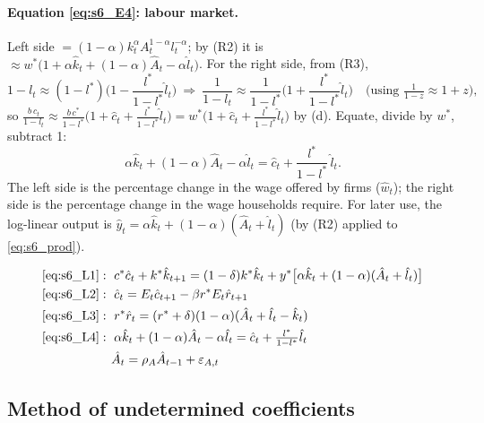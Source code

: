 \paragraph{Equation \eqref{eq:s6_E4}: labour market.} Left side $=(1-\alpha)k_t^{\alpha}A_t^{1-\alpha}l_t^{-\alpha}$; by (R2) it is $\approx w^*\big(1+\alpha\hat k_t+(1-\alpha)\hat A_t-\alpha\hat l_t\big)$. For the right side, from (R3),
\[
1-l_t\approx(1-l^*)\Big(1-\frac{l^*}{1-l^*}\hat l_t\Big)
\ \Rightarrow\ \frac{1}{1-l_t}\approx\frac{1}{1-l^*}\Big(1+\frac{l^*}{1-l^*}\hat l_t\Big)\quad\Big(\text{using }\tfrac{1}{1-z}\approx1+z\Big),
\]
so $\frac{b\,c_t}{1-l_t}\approx\frac{b\,c^*}{1-l^*}\big(1+\hat c_t+\frac{l^*}{1-l^*}\hat l_t\big)=w^*\big(1+\hat c_t+\frac{l^*}{1-l^*}\hat l_t\big)$ by (d). Equate, divide by $w^*$, subtract 1:
\begin{equation}\label{eq:s6_L4}
\alpha\hat k_t+(1-\alpha)\hat A_t-\alpha\hat l_t=\hat c_t+\frac{l^*}{1-l^*}\,\hat l_t .
\end{equation}
The left side is the percentage change in the wage offered by firms ($\hat w_t$); the right side is the percentage change in the wage households require. For later use, the log-linear output is $\hat y_t=\alpha\hat k_t+(1-\alpha)(\hat A_t+\hat l_t)$ (by (R2) applied to \eqref{eq:s6_prod}).

\begin{keybox}[title=Log-linear RBC system]
\begin{align*}
\eqref{eq:s6_L1}&:\ c^*\hat c_t+k^*\hat k_{t+1}=(1-\delta)k^*\hat k_t+y^*\big[\alpha\hat k_t+(1-\alpha)(\hat A_t+\hat l_t)\big]\\
\eqref{eq:s6_L2}&:\ \hat c_t=E_t\hat c_{t+1}-\beta r^*E_t\hat r_{t+1}\\
\eqref{eq:s6_L3}&:\ r^*\hat r_t=(r^*+\delta)(1-\alpha)(\hat A_t+\hat l_t-\hat k_t)\\
\eqref{eq:s6_L4}&:\ \alpha\hat k_t+(1-\alpha)\hat A_t-\alpha\hat l_t=\hat c_t+\tfrac{l^*}{1-l^*}\hat l_t\\
&\phantom{:}\ \ \hat A_t=\rho_A\hat A_{t-1}+\varepsilon_{A,t}
\end{align*}
\end{keybox}

\subsection{Method of undetermined coefficients }

